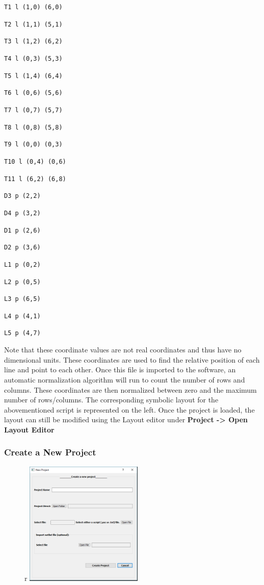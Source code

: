 \documentclass[11pt]{article}
\begin{document}
\texttt{T1 l (1,0) (6,0)}

\texttt{T2 l (1,1) (5,1)}

\texttt{T3 l (1,2) (6,2)}

\texttt{T4 l (0,3) (5,3)}

\texttt{T5 l (1,4) (6,4)}

\texttt{T6 l (0,6) (5,6)}

\texttt{T7 l (0,7) (5,7)}

\texttt{T8 l (0,8) (5,8)}

\texttt{T9 l (0,0) (0,3)}

\texttt{T10 l (0,4) (0,6)}

\texttt{T11 l (6,2) (6,8)}

\texttt{D3 p (2,2)}

\texttt{D4 p (3,2)}

\texttt{D1 p (2,6)}

\texttt{D2 p (3,6)}

\texttt{L1 p (0,2)}

\texttt{L2 p (0,5)}

\texttt{L3 p (6,5)}

\texttt{L4 p (4,1)}

\texttt{L5 p (4,7)}



\bigskip
\bigskip
\bigskip

Note that these coordinate values are not real coordinates and thus have no dimensional units. These coordinates are used to find the relative position of each line and point to each other. Once this file is imported to the software, an automatic normalization algorithm will run to count the number of rows and columns. These coordinates are then normalized between zero and the maximum number of rows/columns. The corresponding symbolic layout for the abovementioned script is represented on the left. Once the project is loaded, the layout can still be modified using the Layout editor under \textbf{Project -> Open Layout Editor}

\pagebreak

\subsubsection{Create a New Project}
\label{sec-2-2-3}

\begin{figure}{r}
\centering
\includegraphics[width=0.5\textwidth]{./figs/04_NewProj.png}
\end{figure}
\end{document}
